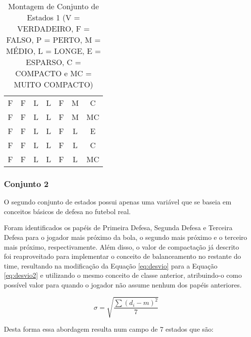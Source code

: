 \begin{table}[hbt]
\begin{tabular}{c|c|c|c|c|c|c}
        F       &   F       &   L       &   L       &   F       &   M       &   C \\
        F       &   F       &   L       &   L       &   F       &   M       &   MC \\
        F       &   F       &   L       &   L       &   F       &   L       &   E \\
        F       &   F       &   L       &   L       &   F       &   L       &   C \\
        F       &   F       &   L       &   L       &   F       &   L       &   MC \\
    \end{tabular}
    \caption{Montagem de Conjunto de Estados 1 (V = VERDADEIRO, F = FALSO, P = PERTO, M = MÉDIO, L = LONGE, E = ESPARSO, C = COMPACTO e MC = MUITO COMPACTO)}
    \label{tab:states1}
\end{table}

\subsubsection{Conjunto 2}

O segundo conjunto de estados possui apenas uma variável que se baseia em
conceitos básicos de defesa no futebol real.

Foram identificados os papéis de Primeira Defesa, Segunda Defesa e Terceira
Defesa para o jogador mais próximo da bola, o segundo mais próximo e o terceiro
mais próximo, respectivamente. Além disso, o valor de compactação já descrito
foi reaproveitado para implementar o conceito de balanceamento no restante do
time, resultando na modificação da Equação \ref{eq:desvio} para a Equação
\ref{eq:desvio2} e utilizando o mesmo conceito de classe anterior, atribuindo-o
como possível valor para quando o jogador não assume nenhum dos papéis anteriores.

\begin{equation}
    \sigma=\sqrt{\frac{\sum{(d_i - m)^2}}{7}}
    \label{eq:desvio2}
\end{equation}

Desta forma essa abordagem resulta num campo de 7 estados que são:

